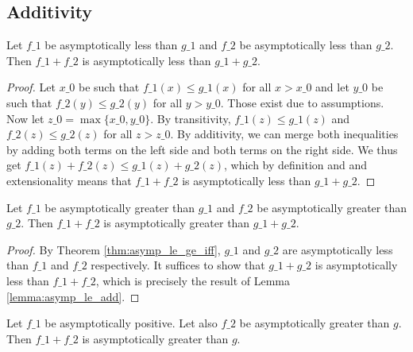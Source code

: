 \subsection{Additivity}

\begin{lemma}
    \label{lemma:asymp_le_add}
    \leanok
    Let $f\_1$ be asymptotically less than $g\_1$ and $f\_2$ be asymptotically less
    than $g\_2$. Then $f\_1 + f\_2$ is asymptotically less than $g\_1 + g\_2$.
\end{lemma}

\begin{proof}
    \leanok
    Let $x\_0$ be such that $f\_1(x) \le g\_1(x)$ for all $x > x\_0$ and let $y\_0$ be
    such that $f\_2(y) \le g\_2(y)$ for all $y > y\_0$. Those exist due to assumptions.
    Now let $z\_0 = \max \{ x\_0, y\_0 \}$. By transitivity, $f\_1(z) \le g\_1(z)$ and 
    $f\_2(z) \le g\_2(z)$ for all $z > z\_0$. By additivity, we can merge both 
    inequalities by adding both terms on the left side and both terms on the right side.
    We thus get $f\_1(z) + f\_2(z) \le g\_1(z) + g\_2(z)$, which by definition and 
    and extensionality means that $f\_1 + f\_2$ is asymptotically less than $g\_1 + g\_2$.
\end{proof}

\begin{lemma}
    \label{lemma:asymp_ge_add}
    \leanok
    Let $f\_1$ be asymptotically greater than $g\_1$ and $f\_2$ be asymptotically greater
    than $g\_2$. Then $f\_1 + f\_2$ is asymptotically greater than $g\_1 + g\_2$.
\end{lemma}

\begin{proof}
    \leanok
    By Theorem \ref{thm:asymp_le_ge_iff}, $g\_1$ and $g\_2$ are asymptotically less 
    than $f\_1$ and $f\_2$ respectively. It suffices to show that $g\_1 + g\_2$ is
    asymptotically less than $f\_1 + f\_2$, which is precisely the result of
    Lemma \ref{lemma:asymp_le_add}.
\end{proof}

\begin{lemma}
    \label{lemma:asymp_ge_add_pos}
    \leanok
    Let $f\_1$ be asymptotically positive. Let also $f\_2$ be asymptotically greater 
    than $g$. Then $f\_1 + f\_2$ is asymptotically greater than $g$.
\end{lemma}

